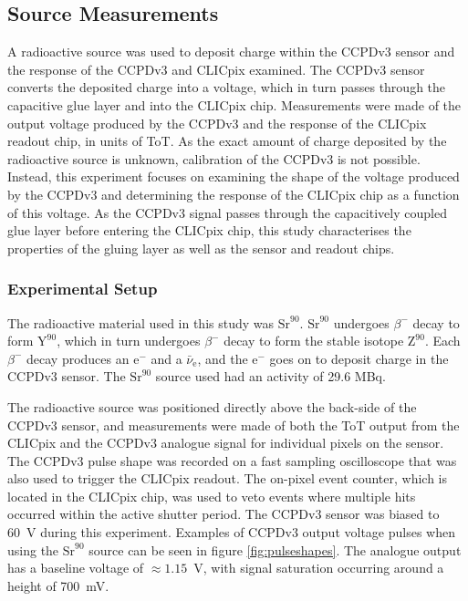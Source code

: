 
\subsection{Source Measurements}
\label{sec:source}
A radioactive source was used to deposit charge within the CCPDv3 sensor and the response of the CCPDv3 and CLICpix examined.  The CCPDv3 sensor converts the deposited charge into a voltage, which in turn passes through the capacitive glue layer and into the CLICpix chip.  Measurements were made of the output voltage produced by the CCPDv3 and the response of the CLICpix readout chip, in units of ToT.  As the exact amount of charge deposited by the radioactive source is unknown, calibration of the CCPDv3 is not possible.  Instead, this experiment focuses on examining the shape of the voltage produced by the CCPDv3 and determining the response of the CLICpix chip as a function of this voltage.  As the CCPDv3 signal passes through the capacitively coupled glue layer before entering the CLICpix chip, this study characterises the properties of the gluing layer as well as the sensor and readout chips.


\subsubsection{Experimental Setup}
The radioactive material used in this study was $\text{Sr}^{90}$.  $\text{Sr}^{90}$ undergoes $\beta^{-}$ decay to form $\text{Y}^{90}$, which in turn undergoes $\beta^{-}$ decay to form the stable isotope $\text{Z}^{90}$.  Each $\beta^{-}$ decay produces an $\text{e}^{-}$ and a $\bar{\nu}_{\text{e}}$, and the $\text{e}^{-}$ goes on to deposit charge in the CCPDv3 sensor.  The $\text{Sr}^{90}$ source used had an activity of 29.6 MBq.  

The radioactive source was positioned directly above the back-side of the CCPDv3 sensor, and measurements were made of both the ToT output from the CLICpix and the CCPDv3 analogue signal for individual pixels on the sensor.  The CCPDv3 pulse shape was recorded on a fast sampling oscilloscope that was also used to trigger the CLICpix readout.  The on-pixel event counter, which is located in the CLICpix chip, was used to veto events where multiple hits occurred within the active shutter period.  The CCPDv3 sensor was biased to 60~V during this experiment.  Examples of CCPDv3 output voltage pulses when using the $\text{Sr}^{90}$ source can be seen in figure \ref{fig:pulseshapes}.  The analogue output has a baseline voltage of $\approx 1.15$~V, with signal saturation occurring around a height of 700~mV.  

